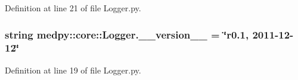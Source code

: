 Definition at line 21 of file Logger.py.

\hypertarget{namespacemedpy_1_1core_1_1Logger_a7ef28525455e310cb33b01ada30fd041}{
\subsubsection[{\_\-\_\-version\_\-\_\-}]{\setlength{\rightskip}{0pt plus 5cm}string {\bf medpy::core::Logger.\_\-\_\-version\_\-\_\-} = \char`\"{}r0.1, 2011-\/12-\/12\char`\"{}}}
\label{namespacemedpy_1_1core_1_1Logger_a7ef28525455e310cb33b01ada30fd041}


Definition at line 19 of file Logger.py.

